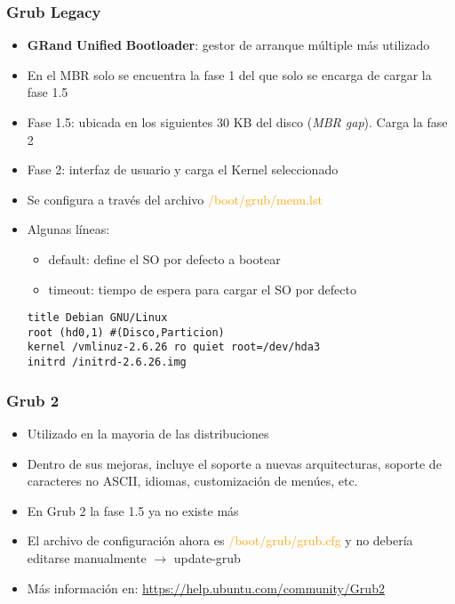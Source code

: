 \begin{frame}[fragile]
	\frametitle{Grub Legacy}
	\begin{itemize}
		\item \textbf{GRand} \textbf{Unified} \textbf{Bootloader}: gestor de arranque múltiple más utilizado
		\item En el MBR solo se encuentra la fase 1 del que solo se encarga de cargar la fase 1.5
		\item Fase 1.5: ubicada en los siguientes 30 KB del disco (\textit{MBR gap}). Carga la fase 2
		\item Fase 2: interfaz de usuario y carga el Kernel seleccionado
		\item Se configura a través del archivo \textcolor{orange}{/boot/grub/menu.lst}
		\item Algunas líneas:
		\begin{itemize}
			\item default: define el SO por defecto a bootear
			\item timeout: tiempo de espera para cargar el SO por defecto
		\end{itemize}
		\begin{lstlisting}
title Debian GNU/Linux
root (hd0,1) #(Disco,Particion)
kernel /vmlinuz-2.6.26 ro quiet root=/dev/hda3
initrd /initrd-2.6.26.img
		\end{lstlisting}		
	\end{itemize}
\end{frame}

\begin{frame}
	\frametitle{Grub 2}
	\begin{itemize}
		\item Utilizado en la mayoria de las distribuciones
		\item Dentro de sus mejoras, incluye el soporte a nuevas arquitecturas, soporte de caracteres no ASCII, idiomas, customización de menúes, etc.
		\item En Grub 2 la fase 1.5 ya no existe más
		\item El archivo de configuración ahora es \textcolor{orange}{/boot/grub/grub.cfg} y no debería editarse manualmente $\rightarrow$ update-grub
		\item Más información en: \url{https://help.ubuntu.com/community/Grub2}
	\end{itemize}
\end{frame}

